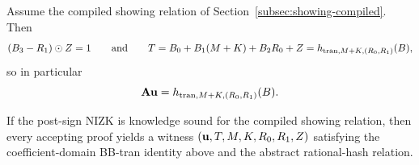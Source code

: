 \begin{corollary}\label{cor:showing-to-abstract}
Assume the compiled showing relation of Section~\ref{subsec:showing-compiled}. Then
\[
(B_3-R_1)\odot Z=1
\qquad\text{and}\qquad
T=B_0+B_1(M+K)+B_2R_0+Z=h_{\mathrm{tran},M+K,(R_0,R_1)}(B),
\]
so in particular
\[
\mathbf{A}\mathbf{u} = h_{\mathrm{tran},M+K,(R_0,R_1)}(B).
\]
\end{corollary}

\begin{corollary}\label{cor:showing-proof-consequence}
If the post-sign NIZK is knowledge sound for the compiled showing relation, then every accepting proof yields a
witness \((\mathbf{u},T,M,K,R_0,R_1,Z)\) satisfying the coefficient-domain BB-tran identity above and the abstract
rational-hash relation.
\end{corollary}
